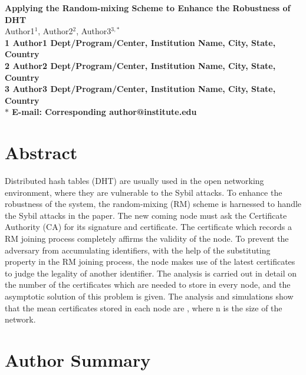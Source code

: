 \documentclass[10pt]{article}
\date{}
\begin{document}
\newtheorem{defination}{defination}[section]
\newtheorem{theorem}{theorem}[section]
\newtheorem{lemma}[theorem]{lemma}
\newtheorem{corollary}[theorem]{corollary}
\begin{flushleft}
{\Large
\textbf{Applying the Random-mixing Scheme to Enhance the Robustness of DHT}
}
\\
Author1$^{1}$, 
Author2$^{2}$, 
Author3$^{3,\ast}$
\\
\bf{1} Author1 Dept/Program/Center, Institution Name, City, State, Country
\\
\bf{2} Author2 Dept/Program/Center, Institution Name, City, State, Country
\\
\bf{3} Author3 Dept/Program/Center, Institution Name, City, State, Country
\\
$\ast$ E-mail: Corresponding author@institute.edu
\end{flushleft}
\tableofcontents
\section{Abstract}
Distributed hash tables (DHT) are usually used in the open networking environment, where they are vulnerable to the Sybil attacks. To enhance the robustness of the system, the random-mixing (RM) scheme is harnessed to handle the Sybil attacks in the paper. The new coming node must ask the Certificate Authority (CA) for its signature and certificate. The certificate which records a RM joining process completely affirms the validity of the node. To prevent the adversary from accumulating identifiers, with the help of the substituting property in the RM joining process, the node makes use of the latest certificates to judge the legality of another identifier. The analysis is carried out in detail on the number of the certificates which are needed to store in every node, and the asymptotic solution of this problem is given. The analysis and simulations show that the mean certificates stored in each node are  , where n is the size of the network.
\section{Author Summary}
\end{document}
